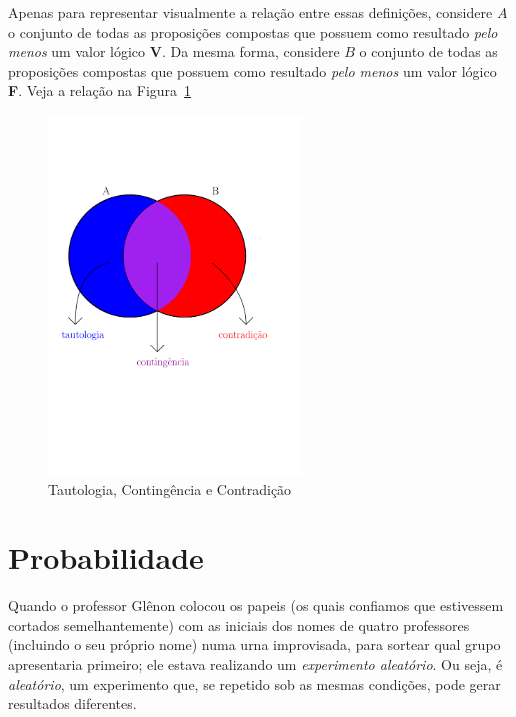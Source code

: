 \documentclass[12pt]{article}
\theoremstyle{definition}
\newcommand{\V}{\textbf{V}}
\newcommand{\F}{\textbf{F}}
\begin{document}
Apenas para representar visualmente a relação entre essas definições, considere
$A$ o conjunto de todas as proposições compostas que possuem como resultado
\textit{pelo menos} um valor lógico \V. 
Da mesma forma, considere $B$ o conjunto de todas as proposições compostas que
possuem como resultado \textit{pelo menos} um valor lógico \F.
Veja a relação na Figura~\ref{fig:diagrama-contingencia}

\begin{figure}[!h]%
\centering
\includegraphics[width=0.6\textwidth]{diagrama-contingencia}%
\caption{Tautologia, Contingência e Contradição}%
\label{fig:diagrama-contingencia}%
\end{figure}

\section{Probabilidade}
Quando o professor Glênon colocou os papeis (os quais confiamos que estivessem
cortados semelhantemente) com as iniciais dos nomes de quatro professores 
(incluindo o seu próprio nome) numa urna improvisada, para sortear 
qual grupo apresentaria primeiro; ele estava realizando um \textit{experimento 
aleatório}.
Ou seja, é \textit{aleatório}, um experimento que, se repetido sob as mesmas 
condições, pode gerar resultados diferentes.
\end{document}
